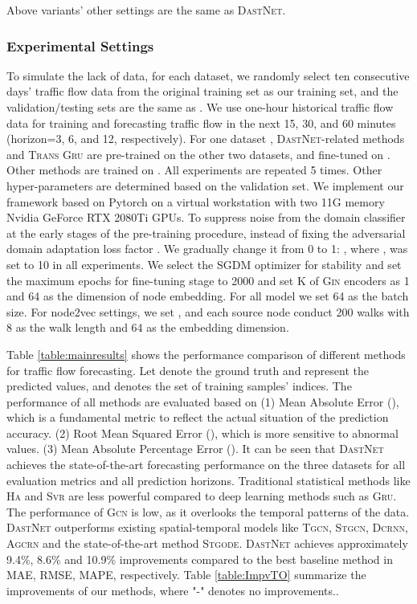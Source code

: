 \documentclass[sigconf]{acmart}
\theoremstyle{definition}
\begin{document}
Above variants' other settings are the same as \textsc{DastNet}.


\subsubsection{Experimental Settings}
To simulate the lack of data, for each dataset, we randomly select ten consecutive days' traffic flow data from the original training set as our training set, and the validation/testing sets are the same as \cite{li2021dynamic}.
We use one-hour historical traffic flow data for training and forecasting traffic flow in the next 15, 30, and 60 minutes (horizon=3, 6, and 12, respectively). For one dataset , \textsc{DastNet}-related methods and \textsc{Trans Gru} are pre-trained on the other two datasets, and fine-tuned on . Other methods are trained on . All experiments are repeated 5 times. Other hyper-parameters are determined based on the validation set. We implement our framework based on Pytorch \cite{paszke2019pytorch} on a virtual workstation with two 11G memory Nvidia GeForce RTX 2080Ti GPUs. To suppress noise from the domain classifier at the early stages of the pre-training procedure, instead of fixing the adversarial domain adaptation loss factor . We gradually change it from 0 to 1: , where ,  was set to 10 in all experiments. We select the SGDM optimizer for stability and set the maximum epochs for fine-tuning stage to 2000 and set K of \textsc{Gin} encoders as 1 and 64 as the dimension of node embedding. For all model we set 64 as the batch size. 
For node2vec settings, we set , and each source node conduct 200 walks with 8 as the walk length and 64 as the embedding dimension.






Table \ref{table:mainresults} shows the performance comparison of different methods for traffic flow forecasting. Let  denote the ground truth and  represent the predicted values, and  denotes the set of training samples' indices. The performance of all methods are evaluated based on (1) Mean Absolute Error (), which is a fundamental metric to reflect the actual situation of the prediction accuracy. (2) Root Mean Squared Error (), which is more sensitive to abnormal values. (3) Mean Absolute Percentage Error (). It can be seen that \textsc{DastNet} achieves the state-of-the-art forecasting performance on the three datasets for all evaluation metrics and all prediction horizons. Traditional statistical methods like \textsc{Ha} and \textsc{Svr} are less powerful compared to deep learning methods such as \textsc{Gru}. 
The performance of \textsc{Gcn} is low, as it overlooks the temporal patterns of the data. 
\textsc{DastNet} outperforms existing spatial-temporal models like \textsc{Tgcn}, \textsc{Stgcn}, \textsc{Dcrnn}, \textsc{Agcrn} and the state-of-the-art method \textsc{Stgode}. \textsc{DastNet} achieves approximately 9.4\%, 8.6\% and 10.9\% improvements compared to the best baseline method in MAE, RMSE, MAPE, respectively. Table \ref{table:ImpvTO} summarize the improvements of our methods, where "-" denotes no improvements.. 
\end{document}

